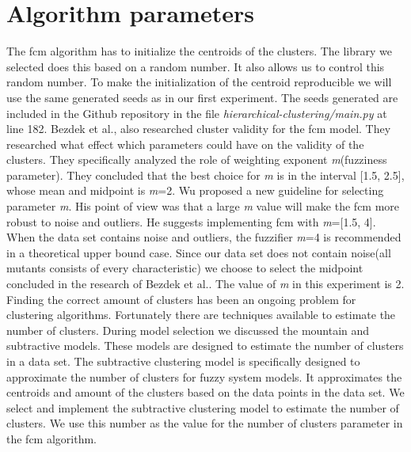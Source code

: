 \documentclass[../../main]{subfiles}
\begin{document}
\section{Algorithm parameters}
The \acrshort{fcm} algorithm has to initialize the centroids of the clusters.
The library we selected does this based on a random number.
It also allows us to control this random number.
To make the initialization of the centroid reproducible we will use the same generated seeds as in our first experiment.
The seeds generated are included in the Github repository in the file \textit{hierarchical-clustering/main.py} at line 182\cite{rbasarat-repo}.
\newline
Bezdek et al., also researched cluster validity for the \acrshort{fcm} model\cite{Bezdek1995OnModel}.
They researched what effect which parameters could have on the validity of the clusters.
They specifically analyzed the role of weighting exponent \textit{m}(fuzziness parameter).
They concluded that the best choice for \textit{m} is in the interval [1.5, 2.5], whose mean and midpoint is \textit{m}=2.
Wu proposed a new guideline for selecting parameter \textit{m}\cite{Wu2012}.
His point of view was that a large \textit{m} value will make the \acrlong{fcm} more robust to noise and outliers.
He suggests implementing \acrlong{fcm} with \textit{m}=[1.5, 4].
When the data set contains noise and outliers, the fuzzifier \textit{m}=4 is recommended in a theoretical upper bound case.
Since our data set does not contain noise(all mutants consists of every characteristic) we choose to select the midpoint concluded in the research of Bezdek et al.\cite{Bezdek1995OnModel}.
The value of \textit{m} in this experiment is 2.
\newline
Finding the correct amount of clusters has been an ongoing problem for clustering algorithms\cite{Du2010Clustering:Approach}.
Fortunately there are techniques available to estimate the number of clusters.
During model selection we discussed the mountain and subtractive models. 
These models are designed to estimate the number of clusters in a data set.
The subtractive clustering model is specifically designed to approximate the number of clusters for fuzzy system models\cite{Chiu1994FuzzyEstimation}.
It approximates the centroids and amount of the clusters based on the data points in the data set\cite{Chiu1994FuzzyEstimation}.
We select and implement the subtractive clustering model to estimate the number of clusters.
We use this number as the value for the number of clusters parameter in the \acrshort{fcm} algorithm.
\end{document}
